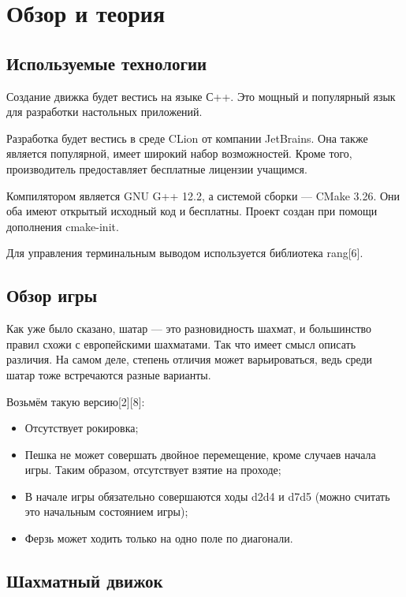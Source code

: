 {

	\chapter{Обзор и теория}
	\section{Используемые технологии}
	Создание движка будет вестись на языке С++. Это мощный и  популярный язык для разработки настольных приложений.
	
	Разработка будет вестись в среде CLion от компании JetBrains. Она также является популярной, имеет широкий набор возможностей. Кроме того, производитель предоставляет бесплатные лицензии учащимся. 
	
	Компилятором является GNU G++ 12.2, а системой сборки --- CMake 3.26. Они оба имеют открытый исходный код и бесплатны. Проект создан при помощи дополнения cmake-init.
	
	Для управления терминальным выводом используется библиотека rang[6].
	
	\section{Обзор игры}
	
	Как уже было сказано, шатар --- это разновидность шахмат, и большинство правил схожи с европейскими шахматами. Так что имеет смысл описать различия.
	На самом деле, степень отличия может варьироваться, ведь среди шатар тоже встречаются разные варианты. 
	
	Возьмём такую версию[2][8]:
	
	\begin{itemize}
		\item Отсутствует рокировка;
		\item Пешка не может совершать двойное перемещение, кроме случаев начала игры. Таким образом, отсутствует взятие на проходе;
		\item В начале игры обязательно совершаются ходы d2d4 и d7d5 (можно считать это начальным состоянием игры);
		\item  Ферзь может ходить только на одно поле по диагонали.
	\end{itemize}
	
	\section{Шахматный движок}
	
}
